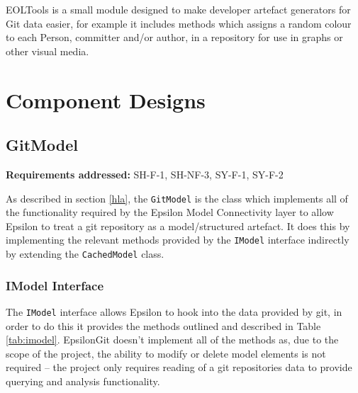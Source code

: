 \documentclass[11pt]{book}
\newcommand{\code}[1]{\texttt{#1}}
\begin{document}
EOLTools is a small module designed to make 	developer artefact generators for Git data easier, for example it includes methods which assigns a random colour to each Person, committer and/or author, in a repository for use in graphs or other visual media.

\section{Component Designs}
\subsection{GitModel}
\begin{tcolorbox}
\textbf{Requirements addressed:}  SH-F-1, SH-NF-3, SY-F-1, SY-F-2
\end{tcolorbox}

As described in section \ref{hla}, the \code{GitModel} is the class which implements all of the functionality required by the Epsilon Model Connectivity layer to allow Epsilon to treat a git repository as a model/structured artefact. It does this by implementing the relevant methods provided by the \code{IModel} interface indirectly by extending the \code{CachedModel} class.

\subsubsection{IModel Interface}
The \code{IModel} interface allows Epsilon to hook into the data provided by git, in order to do this it provides the methods outlined and described in Table \ref{tab:imodel}. EpsilonGit doesn't implement all of the methods as, due to the scope of the project, the ability to modify or delete model elements is not required -- the project only requires reading of a git repositories data to provide querying and analysis functionality.
\end{document}

